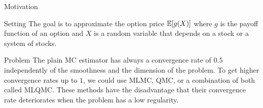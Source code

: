 \begin{frame}{Motivation}
	\begin{block}{Setting}
		The goal is to approximate the option price $\mathbb{E}[g(X)]$ where $g$ is the payoff function of an option and $X$ is a random variable that depends on a stock or a system of stocks. 
	\end{block}
	\begin{block}{Problem}
		The plain MC estimator has always a convergence rate of $0.5$ independently of the smoothness and the dimension of the problem. To get higher convergence rates up to $1$, we could use MLMC, QMC, or a combination of both called MLQMC. These methods have the disadvantage that their convergence rate deteriorates when the problem has a low regularity. 
	\end{block}
\end{frame}